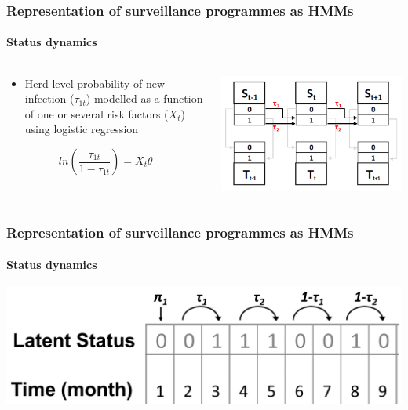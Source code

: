 \documentclass{beamer}
\begin{document}
\begin{frame}
\frametitle{Representation of surveillance programmes as HMMs}
\framesubtitle{Status dynamics}
\begin{columns}
\begin{column}{0.6\textwidth}
\begin{itemize}
  \item{Herd level probability of new infection ($\tau_{1t}$) modelled as a function of one or several risk factors ($X_t$) using logistic regression}
\end{itemize}
\vspace{.5cm}
$$ln(\frac{\tau_{1t}}{1 - \tau_{1t}}) = X_{t} \theta$$
\end{column}
\begin{column}{0.4\textwidth}
\vspace{2cm}
\includegraphics[width = 1.1\textwidth]{imgs/dynamics.png}
\end{column}
\end{columns}
\end{frame}

\begin{frame}
\frametitle{Representation of surveillance programmes as HMMs}
\framesubtitle{Status dynamics}
\includegraphics[width = \textwidth]{imgs/infection_dynamics.png}
\end{frame}
\end{document}
